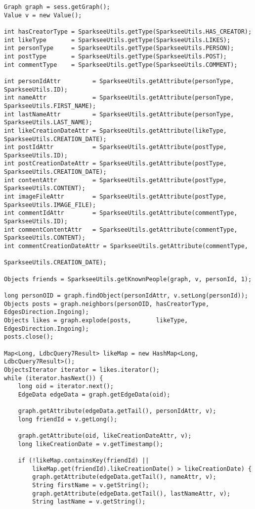 {\footnotesize
\begin{verbatim}
Graph graph = sess.getGraph();
Value v = new Value();

int hasCreatorType = SparkseeUtils.getType(SparkseeUtils.HAS_CREATOR);
int likeType       = SparkseeUtils.getType(SparkseeUtils.LIKES);
int personType     = SparkseeUtils.getType(SparkseeUtils.PERSON);
int postType       = SparkseeUtils.getType(SparkseeUtils.POST);
int commentType    = SparkseeUtils.getType(SparkseeUtils.COMMENT);

int personIdAttr         = SparkseeUtils.getAttribute(personType, SparkseeUtils.ID);
int nameAttr             = SparkseeUtils.getAttribute(personType, SparkseeUtils.FIRST_NAME);
int lastNameAttr         = SparkseeUtils.getAttribute(personType, SparkseeUtils.LAST_NAME);
int likeCreationDateAttr = SparkseeUtils.getAttribute(likeType, SparkseeUtils.CREATION_DATE);
int postIdAttr           = SparkseeUtils.getAttribute(postType, SparkseeUtils.ID);
int postCreationDateAttr = SparkseeUtils.getAttribute(postType, SparkseeUtils.CREATION_DATE);
int contentAttr          = SparkseeUtils.getAttribute(postType, SparkseeUtils.CONTENT);
int imageFileAttr        = SparkseeUtils.getAttribute(postType, SparkseeUtils.IMAGE_FILE);
int commentIdAttr        = SparkseeUtils.getAttribute(commentType, SparkseeUtils.ID);
int commentContentAttr   = SparkseeUtils.getAttribute(commentType, SparkseeUtils.CONTENT);
int commentCreationDateAttr = SparkseeUtils.getAttribute(commentType, 
                                                         SparkseeUtils.CREATION_DATE);

Objects friends = SparkseeUtils.getKnownPeople(graph, v, personId, 1);

long personOID = graph.findObject(personIdAttr, v.setLong(personId));
Objects posts = graph.neighbors(personOID, hasCreatorType, EdgesDirection.Ingoing);
Objects likes = graph.explode(posts,       likeType,       EdgesDirection.Ingoing);
posts.close();

Map<Long, LdbcQuery7Result> likeMap = new HashMap<Long, LdbcQuery7Result>();
ObjectsIterator iterator = likes.iterator();
while (iterator.hasNext()) {
    long oid = iterator.next();
    EdgeData edgeData = graph.getEdgeData(oid);

    graph.getAttribute(edgeData.getTail(), personIdAttr, v);
    long friendId = v.getLong();

    graph.getAttribute(oid, likeCreationDateAttr, v);
    long likeCreationDate = v.getTimestamp();

    if (!likeMap.containsKey(friendId) || 
        likeMap.get(friendId).likeCreationDate() > likeCreationDate) {
        graph.getAttribute(edgeData.getTail(), nameAttr, v);
        String firstName = v.getString();
        graph.getAttribute(edgeData.getTail(), lastNameAttr, v);
        String lastName = v.getString();


\end{verbatim}}
